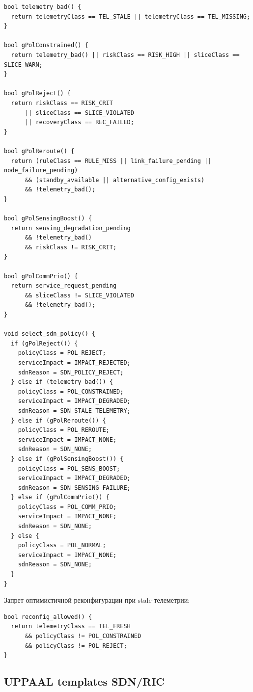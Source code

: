 \documentclass[10pt,a4paper]{article}
\begin{document}
\begin{verbatim}
bool telemetry_bad() {
  return telemetryClass == TEL_STALE || telemetryClass == TEL_MISSING;
}

bool gPolConstrained() {
  return telemetry_bad() || riskClass == RISK_HIGH || sliceClass == SLICE_WARN;
}

bool gPolReject() {
  return riskClass == RISK_CRIT
      || sliceClass == SLICE_VIOLATED
      || recoveryClass == REC_FAILED;
}

bool gPolReroute() {
  return (ruleClass == RULE_MISS || link_failure_pending || node_failure_pending)
      && (standby_available || alternative_config_exists)
      && !telemetry_bad();
}

bool gPolSensingBoost() {
  return sensing_degradation_pending
      && !telemetry_bad()
      && riskClass != RISK_CRIT;
}

bool gPolCommPrio() {
  return service_request_pending
      && sliceClass != SLICE_VIOLATED
      && !telemetry_bad();
}

void select_sdn_policy() {
  if (gPolReject()) {
    policyClass = POL_REJECT;
    serviceImpact = IMPACT_REJECTED;
    sdnReason = SDN_POLICY_REJECT;
  } else if (telemetry_bad()) {
    policyClass = POL_CONSTRAINED;
    serviceImpact = IMPACT_DEGRADED;
    sdnReason = SDN_STALE_TELEMETRY;
  } else if (gPolReroute()) {
    policyClass = POL_REROUTE;
    serviceImpact = IMPACT_NONE;
    sdnReason = SDN_NONE;
  } else if (gPolSensingBoost()) {
    policyClass = POL_SENS_BOOST;
    serviceImpact = IMPACT_DEGRADED;
    sdnReason = SDN_SENSING_FAILURE;
  } else if (gPolCommPrio()) {
    policyClass = POL_COMM_PRIO;
    serviceImpact = IMPACT_NONE;
    sdnReason = SDN_NONE;
  } else {
    policyClass = POL_NORMAL;
    serviceImpact = IMPACT_NONE;
    sdnReason = SDN_NONE;
  }
}
\end{verbatim}

Запрет оптимистичной реконфигурации при stale-телеметрии:
\begin{verbatim}
bool reconfig_allowed() {
  return telemetryClass == TEL_FRESH
      && policyClass != POL_CONSTRAINED
      && policyClass != POL_REJECT;
}
\end{verbatim}

\subsection{UPPAAL templates SDN/RIC}
\end{document}
